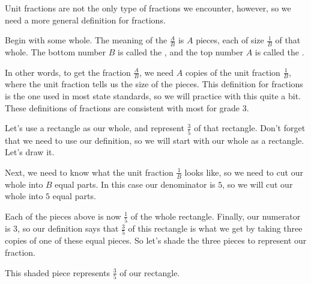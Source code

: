 \documentclass{ximera}
\begin{document}
Unit fractions are not the only type of fractions we encounter, however, so we need a more general definition for fractions.

\begin{definition}
	Begin with some whole. The meaning of the  $\frac{A}{B}$ is $A$ pieces, each of size $\frac{1}{B}$ of that whole. The bottom number $B$ is called the , and the top number $A$ is called the .
\end{definition}
In other words, to get the fraction $\frac{A}{B}$, we need $A$ copies of the unit fraction $\frac{1}{B}$, where the unit fraction tells us the size of the pieces. This definition for fractions is the one used in most state standards, so we will practice with this quite a bit. These definitions of fractions are consistent with most  for grade 3.

\begin{example}
Let's use a rectangle as our whole, and represent $\frac{3}{5}$ of that rectangle. Don't forget that we need to use our definition, so we will start with our whole as a rectangle. Let's draw it.

\begin{image}
\end{image}

Next, we need to know what the unit fraction $\frac{1}{B}$ looks like, so we need to cut our whole into $B$ equal parts. In this case our denominator is $5$, so we will cut our whole into $5$ equal parts.

\begin{image}
\end{image}

Each of the pieces above is now $\frac{1}{5}$ of the whole rectangle. Finally, our numerator is $3$, so our definition says that $\frac{3}{5}$ of this rectangle is what we get by taking three copies of one of these equal pieces. So let's shade the three pieces to represent our fraction.

\begin{image}
\end{image}

This shaded piece represents $\frac{3}{5}$ of our rectangle.

\end{example}
\end{document}
